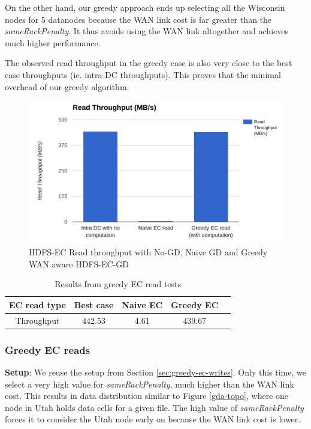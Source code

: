 \documentclass{sig-alternate-05-2015}
\begin{document}
On the other hand, our greedy approach ends up selecting all the Wisconsin nodes for 5 datanodes because the WAN link cost is far greater than the \emph{sameRackPenalty}. It thus avoids using the WAN link altogether and achieves much higher performance.

The observed read throughput in the greedy case is also very close to the best case throughputs (ie. intra-DC throughputs). This proves that the minimal overhead of our greedy algorithm. 

\begin{figure}
\centering
\includegraphics[scale=0.23]{greedy_read_tput.png}
\caption{HDFS-EC Read throughput with No-GD, Naive GD and Greedy WAN aware HDFS-EC-GD}
\label{greedyReadTput}
\end{figure} 

\begin{table}
\centering

\begin{tabular}{|c|c|c|c|l|} \hline
EC read type&Best case&Naive EC&Greedy EC\\ \hline
Throughput&442.53&4.61&439.67\\

\hline\end{tabular}
\caption{Results from greedy EC read tests}
\label{table:gd-reads}
\end{table}


\subsubsection{Greedy EC reads}
\textbf{Setup}: We reuse the setup from Section \ref{sec:greedy-ec-writes}. Only this time, we select a very high value for \emph{sameRackPenalty}, much higher than the WAN link cost. This results in data distribution similar to Figure \ref{gda-topo}, where one node in Utah holds data cells for a given file. The high value of \emph{sameRackPenalty} forces it to consider the Utah node early on because the WAN link cost is lower.
\end{document}
